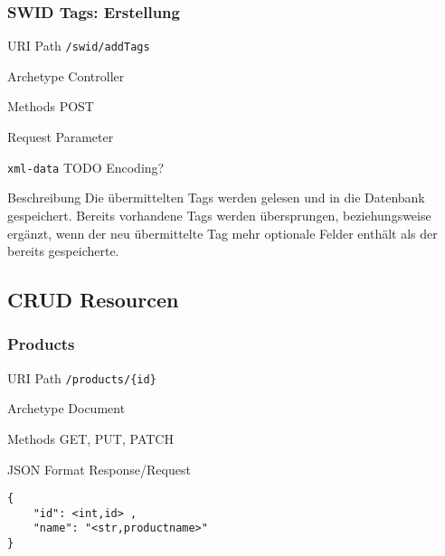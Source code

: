 \documentclass[10pt,a4paper]{scrartcl}
\begin{document}
\subsubsection{SWID Tags: Erstellung}

\begin{mdframed}[style=def]
\begin{description*}
	\item[URI Path] \texttt{/swid/addTags}
	\item[Archetype] Controller
	\item[Methods] POST
	\item[Request Parameter] \hfill
    \begin{description*}
        \item[\texttt{xml-data}] TODO Encoding? 
    \end{description*}
    \item[Beschreibung] Die übermittelten Tags werden gelesen und in die Datenbank gespeichert. Bereits vorhandene Tags werden übersprungen, beziehungsweise ergänzt, wenn der neu übermittelte Tag mehr optionale Felder enthält als der bereits gespeicherte.
\end{description*}
\end{mdframed}

\pagebreak
\subsection{CRUD Resourcen}
\subsubsection{Products}

\begin{mdframed}[style=def]
\begin{description*}
	\item[URI Path] \texttt{/products/\{id\}}
	\item[Archetype] Document
	\item[Methods] GET, PUT, PATCH
	\item[JSON Format Response/Request] \hfill
\begin{lstlisting}
{
	"id": <int,id> ,
	"name": "<str,productname>"
}
\end{lstlisting}
\end{description*}
\end{mdframed}
\end{document}
